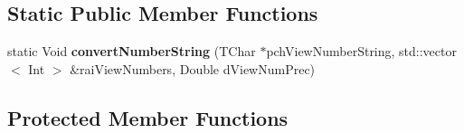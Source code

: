 \subsection*{Static Public Member Functions}
\begin{DoxyCompactItemize}
\item 
\mbox{\label{class_t_app_com_cam_para_aaa3e07af5cbad081d74991748e7a52cf}} 
static Void {\bfseries convert\+Number\+String} (T\+Char $\ast$pch\+View\+Number\+String, std\+::vector$<$ Int $>$ \&rai\+View\+Numbers, Double d\+View\+Num\+Prec)
\end{DoxyCompactItemize}
\subsection*{Protected Member Functions}
